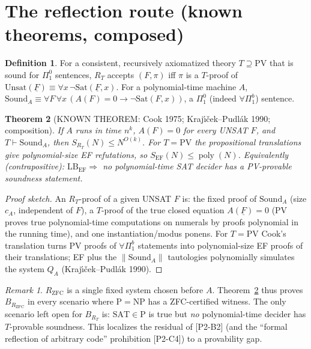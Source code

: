 \documentclass[11pt]{article}
\newtheorem{theorem}{Theorem}
\theoremstyle{definition}
\newtheorem{definition}[theorem]{Definition}
\theoremstyle{remark}
\newtheorem*{remark}{Remark}
\newcommand{\poly}{\operatorname{poly}}
\newcommand{\Sound}{\mathrm{Sound}}
\begin{document}
\section{The reflection route (known theorems, composed)}
\begin{definition}
For a consistent, recursively axiomatized theory $T\supseteq\mathrm{PV}$ that is sound for
$\Pi^0_1$ sentences, $R_T$ accepts $(F,\pi)$ iff $\pi$ is a $T$-proof of
$\mathrm{Unsat}(\underline F)\equiv\forall x\,\neg\mathrm{Sat}(\underline F,x)$.
For a polynomial-time machine $A$,
$\Sound_A\equiv\forall F\,\forall x\,(A(F)=0\rightarrow\neg\mathrm{Sat}(F,x))$, a $\Pi^0_1$ (indeed
$\forall\Pi^b_1$) sentence.
\end{definition}
\begin{theorem}[KNOWN THEOREM: Cook 1975; Kraj\'{\i}\v{c}ek--Pudl\'ak 1990; composition]\label{thm:refl}
If $A$ runs in time $n^k$, $A(F)=0$ for every UNSAT $F$, and $T\vdash\Sound_A$, then
$S_{R_T}(N)\le N^{O(k)}$. For $T=\mathrm{PV}$ the propositional translations give polynomial-size EF
refutations, so $S_{\mathrm{EF}}(N)\le\poly(N)$. Equivalently (contrapositive):
$\mathrm{LB}_{\mathrm{EF}}\Rightarrow$ no polynomial-time SAT decider has a PV-provable soundness statement.
\end{theorem}
\begin{proof}[Proof sketch]
An $R_T$-proof of a given UNSAT $F$ is: the fixed proof of $\Sound_A$ (size $c_A$, independent of $F$),
a $T$-proof of the true closed equation $A(\underline F)=0$ (PV proves true polynomial-time
computations on numerals by proofs polynomial in the running time), and one instantiation/modus
ponens. For $T=\mathrm{PV}$ Cook's translation turns PV proofs of $\forall\Pi^b_1$ statements into
polynomial-size EF proofs of their translations; EF plus the $\|\Sound_A\|$ tautologies
polynomially simulates the system $Q_A$ (Kraj\'{\i}\v{c}ek--Pudl\'ak 1990).
\end{proof}
\begin{remark}
$R_{\mathrm{ZFC}}$ is a single fixed system chosen before $A$. Theorem~\ref{thm:refl} thus proves
$B_{R_{\mathrm{ZFC}}}$ in every scenario where $\mathrm P=\mathrm{NP}$ has a ZFC-certified witness.
The only scenario left open for $B_{R_T}$ is: $\mathrm{SAT}\in\mathrm P$ is true but \emph{no}
polynomial-time decider has $T$-provable soundness. This localizes the residual of [P2-B2] (and the
``formal reflection of arbitrary code'' prohibition [P2-C4]) to a provability gap.
\end{remark}
\end{document}
